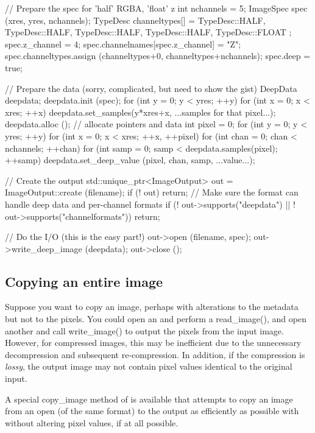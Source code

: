 \begin{code}
    // Prepare the spec for 'half' RGBA, 'float' z
    int nchannels = 5;
    ImageSpec spec (xres, yres, nchannels);
    TypeDesc channeltypes[] = { TypeDesc::HALF, TypeDesc::HALF,
          TypeDesc::HALF, TypeDesc::HALF, TypeDesc::FLOAT };
    spec.z_channel = 4;
    spec.channelnames[spec.z_channel] = "Z";
    spec.channeltypes.assign (channeltypes+0, channeltypes+nchannels);
    spec.deep = true;

    // Prepare the data (sorry, complicated, but need to show the gist)
    DeepData deepdata;
    deepdata.init (spec);
    for (int y = 0;  y < yres;  ++y)
        for (int x = 0;  x < xres;  ++x)
            deepdata.set_samples(y*xres+x, ...samples for that pixel...);
    deepdata.alloc ();  // allocate pointers and data
    int pixel = 0;
    for (int y = 0;  y < yres;  ++y)
        for (int x = 0;  x < xres;  ++x, ++pixel)
            for (int chan = 0;  chan < nchannels;  ++chan)
                for (int samp = 0; samp < deepdata.samples(pixel); ++samp)
                    deepdata.set_deep_value (pixel, chan, samp, ...value...);


    // Create the output
    std::unique_ptr<ImageOutput> out = ImageOutput::create (filename);
    if (! out)
        return;
    // Make sure the format can handle deep data and per-channel formats
    if (! out->supports("deepdata") || ! out->supports("channelformats"))
        return;

    // Do the I/O (this is the easy part!)
    out->open (filename, spec);
    out->write_deep_image (deepdata);
    out->close ();
\end{code}


\subsection{Copying an entire image}
\label{sec:imageoutput:copyimage}

Suppose you want to copy an image, perhaps with alterations to the 
metadata but not to the pixels.  You could open an \ImageInput and
perform a {\cf read_image()}, and open another \ImageOutput and
call {\cf write_image()} to output the pixels from the input image.
However, for compressed images, this may be inefficient due to the
unnecessary decompression and subsequent re-compression.  In addition,
if the compression is \emph{lossy}, the output image may not contain
pixel values identical to the original input.

A special {\cf copy_image} method of \ImageOutput is available that
attempts to copy an image from an open \ImageInput (of the same
format) to the output as efficiently as possible with without altering
pixel values, if at all possible.

